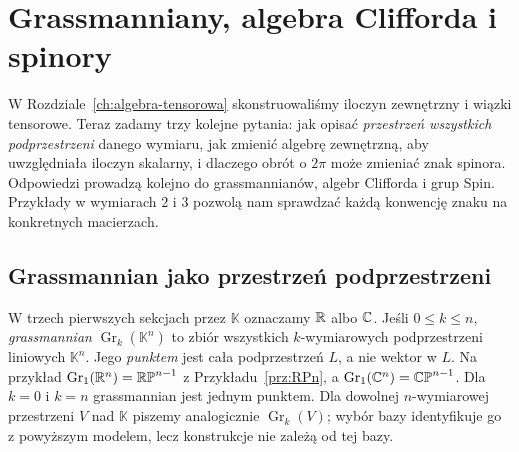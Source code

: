 \chapter{Grassmanniany, algebra Clifforda i spinory}
\label{ch:grass-spin}

W Rozdziale~\ref{ch:algebra-tensorowa} skonstruowaliśmy iloczyn
zewnętrzny i wiązki tensorowe. Teraz zadamy trzy kolejne pytania:
jak opisać \emph{przestrzeń wszystkich podprzestrzeni} danego wymiaru,
jak zmienić algebrę zewnętrzną, aby uwzględniała iloczyn skalarny,
i dlaczego obrót o $2\pi$ może zmieniać znak spinora.
Odpowiedzi prowadzą kolejno do grassmannianów, algebr Clifforda
i grup Spin. Przykłady w wymiarach $2$ i $3$ pozwolą nam
sprawdzać każdą konwencję znaku na konkretnych macierzach.

\section{Grassmannian jako przestrzeń podprzestrzeni}
\label{sec:grass-atlas}

W trzech pierwszych sekcjach przez $\mathbb K$ oznaczamy
$\mathbb{R}$ albo $\mathbb{C}$.
Jeśli $0\leq k\leq n$, \emph{grassmannian}
$\operatorname{Gr}_k(\mathbb K^n)$ to zbiór wszystkich
$k$-wymiarowych podprzestrzeni liniowych $\mathbb K^n$.
Jego \emph{punktem} jest cała podprzestrzeń $L$,
a nie wektor w $L$. Na przykład
$\operatorname{Gr}_1(\mathbb{R}^n)=\mathbb{RP}^{n-1}$
z Przykładu~\ref{prz:RPn}, a
$\operatorname{Gr}_1(\mathbb{C}^n)=\mathbb{CP}^{n-1}$.
Dla $k=0$ i $k=n$ grassmannian jest jednym punktem.
Dla dowolnej $n$-wymiarowej przestrzeni $V$ nad $\mathbb K$
piszemy analogicznie $\operatorname{Gr}_k(V)$; wybór bazy
identyfikuje go z powyższym modelem, lecz konstrukcje nie zależą od tej bazy.

